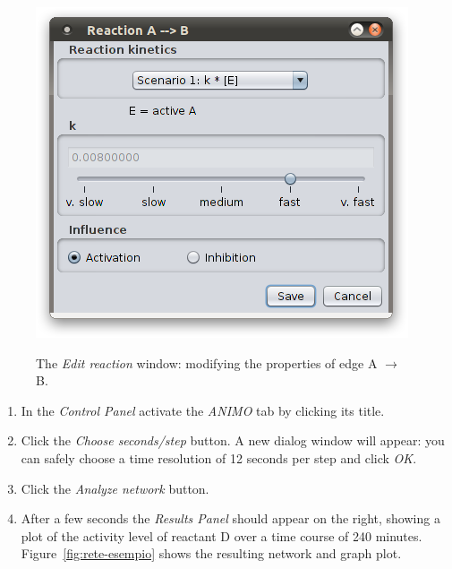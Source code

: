 \begin{figure}[!tpb]
\begin{minipage}{\textwidth}
\begin{center}
\includegraphics[width=.5\textwidth]{images/edit_reactionAB}\\
\caption{The \emph{Edit reaction} window: modifying the properties of edge A $\rightarrow$ B.}\label{fig:edit-reaction}
\end{center}
\end{minipage}
\end{figure}

\begin{enumerate}
\setcounter{enumi}{\value{miocounterperenumerate}}
\item In the \emph{Control Panel} activate the \emph{ANIMO} tab by clicking its title.
\item Click the \emph{Choose seconds/step} button. A new dialog window will appear: you can
safely choose a time resolution of 12 seconds per step and click \emph{OK}.
\item Click the \emph{Analyze network} button.
\item After a few seconds the \emph{Results Panel} should appear on the right,
showing a plot of the activity level of reactant D over a time course of 240 minutes.
Figure~\ref{fig:rete-esempio} shows the resulting network and graph plot.
\end{enumerate}

